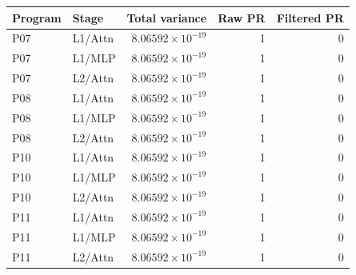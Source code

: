\begin{center}\small
\begin{tabular}{@{}llrrr@{}}
\toprule
Program & Stage & Total variance & Raw PR & Filtered PR \\
\midrule
P07 & L1/Attn & $8.06592\times 10^{-19}$ & 1 & 0 \\
P07 & L1/MLP & $8.06592\times 10^{-19}$ & 1 & 0 \\
P07 & L2/Attn & $8.06592\times 10^{-19}$ & 1 & 0 \\
P08 & L1/Attn & $8.06592\times 10^{-19}$ & 1 & 0 \\
P08 & L1/MLP & $8.06592\times 10^{-19}$ & 1 & 0 \\
P08 & L2/Attn & $8.06592\times 10^{-19}$ & 1 & 0 \\
P10 & L1/Attn & $8.06592\times 10^{-19}$ & 1 & 0 \\
P10 & L1/MLP & $8.06592\times 10^{-19}$ & 1 & 0 \\
P10 & L2/Attn & $8.06592\times 10^{-19}$ & 1 & 0 \\
P11 & L1/Attn & $8.06592\times 10^{-19}$ & 1 & 0 \\
P11 & L1/MLP & $8.06592\times 10^{-19}$ & 1 & 0 \\
P11 & L2/Attn & $8.06592\times 10^{-19}$ & 1 & 0 \\
\bottomrule
\end{tabular}
\end{center}
